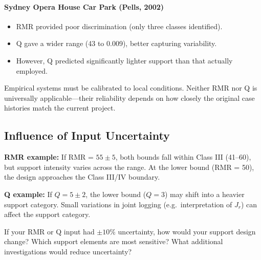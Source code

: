 \paragraph{Sydney Opera House Car Park (Pells, 2002)}
\begin{itemize}
 \item RMR provided poor discrimination (only three classes identified).
 \item Q gave a wider range (43 to 0.009), better capturing variability.
 \item However, Q predicted significantly lighter support than that actually employed.
\end{itemize}

\begin{notebox}
Empirical systems must be calibrated to local conditions. Neither RMR nor Q is universally applicable---their reliability depends on how closely the original case histories match the current project.
\end{notebox}

\subsection{Influence of Input Uncertainty}

\textbf{RMR example:} If RMR = $55 \pm 5$, both bounds fall within Class III (41--60), but support intensity varies across the range. At the lower bound (RMR = 50), the design approaches the Class III/IV boundary.

\textbf{Q example:} If $Q = 5 \pm 2$, the lower bound ($Q = 3$) may shift into a heavier support category. Small variations in joint logging (e.g.\ interpretation of $J_r$) can affect the support category.

\begin{notebox}
If your RMR or Q input had $\pm10\%$ uncertainty, how would your support design change? Which support elements are most sensitive? What additional investigations would reduce uncertainty?
\end{notebox}
